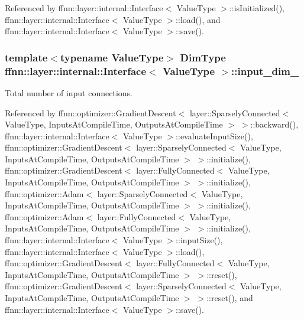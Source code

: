 Referenced by ffnn\-::layer\-::internal\-::\-Interface$<$ Value\-Type $>$\-::is\-Initialized(), ffnn\-::layer\-::internal\-::\-Interface$<$ Value\-Type $>$\-::load(), and ffnn\-::layer\-::internal\-::\-Interface$<$ Value\-Type $>$\-::save().

\hypertarget{classffnn_1_1layer_1_1internal_1_1_interface_aa011c369e00d2b78a87b94904e596f15}{
\subsubsection[{input\-\_\-dim\-\_\-}]{\setlength{\rightskip}{0pt plus 5cm}template$<$typename Value\-Type$>$ {\bf Dim\-Type} {\bf ffnn\-::layer\-::internal\-::\-Interface}$<$ Value\-Type $>$\-::input\-\_\-dim\-\_\-\hspace{0.3cm}{\ttfamily [protected]}}}\label{classffnn_1_1layer_1_1internal_1_1_interface_aa011c369e00d2b78a87b94904e596f15}


Total number of input connections. 



Referenced by ffnn\-::optimizer\-::\-Gradient\-Descent$<$ layer\-::\-Sparsely\-Connected$<$ Value\-Type, Inputs\-At\-Compile\-Time, Outputs\-At\-Compile\-Time $>$ $>$\-::backward(), ffnn\-::layer\-::internal\-::\-Interface$<$ Value\-Type $>$\-::evaluate\-Input\-Size(), ffnn\-::optimizer\-::\-Gradient\-Descent$<$ layer\-::\-Sparsely\-Connected$<$ Value\-Type, Inputs\-At\-Compile\-Time, Outputs\-At\-Compile\-Time $>$ $>$\-::initialize(), ffnn\-::optimizer\-::\-Gradient\-Descent$<$ layer\-::\-Fully\-Connected$<$ Value\-Type, Inputs\-At\-Compile\-Time, Outputs\-At\-Compile\-Time $>$ $>$\-::initialize(), ffnn\-::optimizer\-::\-Adam$<$ layer\-::\-Sparsely\-Connected$<$ Value\-Type, Inputs\-At\-Compile\-Time, Outputs\-At\-Compile\-Time $>$ $>$\-::initialize(), ffnn\-::optimizer\-::\-Adam$<$ layer\-::\-Fully\-Connected$<$ Value\-Type, Inputs\-At\-Compile\-Time, Outputs\-At\-Compile\-Time $>$ $>$\-::initialize(), ffnn\-::layer\-::internal\-::\-Interface$<$ Value\-Type $>$\-::input\-Size(), ffnn\-::layer\-::internal\-::\-Interface$<$ Value\-Type $>$\-::load(), ffnn\-::optimizer\-::\-Gradient\-Descent$<$ layer\-::\-Fully\-Connected$<$ Value\-Type, Inputs\-At\-Compile\-Time, Outputs\-At\-Compile\-Time $>$ $>$\-::reset(), ffnn\-::optimizer\-::\-Gradient\-Descent$<$ layer\-::\-Sparsely\-Connected$<$ Value\-Type, Inputs\-At\-Compile\-Time, Outputs\-At\-Compile\-Time $>$ $>$\-::reset(), and ffnn\-::layer\-::internal\-::\-Interface$<$ Value\-Type $>$\-::save().

